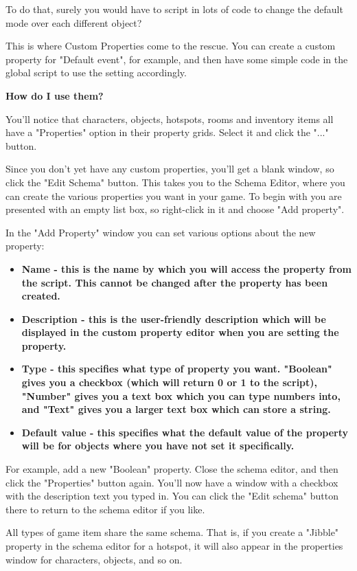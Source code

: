 To do that, surely you would have to script in lots of code to change the default mode
over each different object?

This is where Custom Properties come to the rescue. You can create a custom property
for "Default event", for example, and then have some simple code in the global script
to use the setting accordingly.

\bf{How do I use them?}

You'll notice that characters, objects, hotspots, rooms and inventory items all have
a "Properties" option in their property grids. Select it and click the "..." button.

Since you don't yet have any custom properties, you'll get a blank window, so
click the "Edit Schema" button. This takes you to the Schema Editor, where you
can create the various properties you want in your game. To begin with you are
presented with an empty list box, so right-click in it and choose "Add property".

In the "Add Property" window you can set various options about the new property:
\begin{itemize}
\item \bf{Name} - this is the name by which you will access the property from the script.
This cannot be changed after the property has been created.
\item \bf{Description} - this is the user-friendly description which will be displayed
in the custom property editor when you are setting the property.
\item \bf{Type} - this specifies what type of property you want. "Boolean" gives you
a checkbox (which will return 0 or 1 to the script), "Number" gives you a text box which
you can type numbers into, and "Text" gives you a larger text box which can store a string.
\item \bf{Default value} - this specifies what the default value of the property will be
for objects where you have not set it specifically.
\end{itemize}

For example, add a new "Boolean" property. Close the schema editor, and then click the
"Properties" button again. You'll now have a window with a checkbox with the description
text you typed in. You can click the "Edit schema" button there to return to the schema
editor if you like.

All types of game item share the same schema. That is, if you create a "Jibble" property
in the schema editor for a hotspot, it will also appear in the properties window for
characters, objects, and so on.

